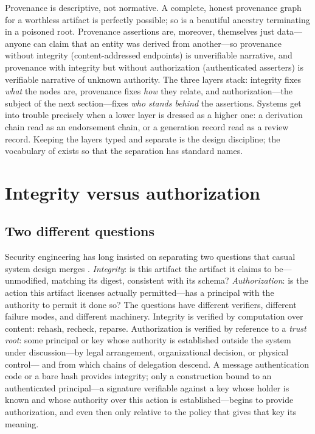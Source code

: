 Provenance is descriptive, not normative. A complete, honest
provenance graph for a worthless artifact is perfectly possible; so
is a beautiful ancestry terminating in a poisoned root. Provenance
assertions are, moreover, themselves just data---anyone can claim
that an entity was derived from another---so provenance without
integrity (content-addressed endpoints) is unverifiable narrative,
and provenance with integrity but without authorization (authenticated
asserters) is verifiable narrative of unknown authority. The three
layers stack: integrity fixes \emph{what} the nodes are, provenance
fixes \emph{how} they relate, and authorization---the subject of the
next section---fixes \emph{who stands behind} the assertions. Systems
get into trouble precisely when a lower layer is dressed as a higher
one: a derivation chain read as an endorsement chain, or a generation
record read as a review record. Keeping the layers typed and separate
is the design discipline; the vocabulary of \cite{prov} exists so
that the separation has standard names.

\section{Integrity versus authorization}\label{ch02:integrity-auth}

\subsection{Two different questions}\label{ch02:twoquestions}

Security engineering has long insisted on separating two questions
that casual system design merges \cite{anderson}. \emph{Integrity}:
is this artifact the artifact it claims to be---unmodified,
matching its digest, consistent with its schema?
\emph{Authorization}: is the action this artifact licenses actually
permitted---has a principal with the authority to permit it done so?
The questions have different verifiers, different failure modes, and
different machinery. Integrity is verified by computation over
content: rehash, recheck, reparse. Authorization is verified by
reference to a \emph{trust root}: some principal or key whose
authority is established outside the system under discussion---by
legal arrangement, organizational decision, or physical control---
and from which chains of delegation descend. A message
authentication code or a bare hash provides integrity; only a
construction bound to an authenticated principal---a signature
verifiable against a key whose holder is known and whose authority
over this action is established---begins to provide authorization,
and even then only relative to the policy that gives that key its
meaning.


